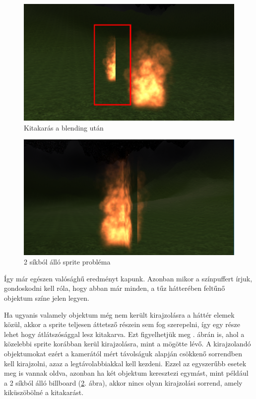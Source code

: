 \begin{figure}[h]
 \centering
 \includegraphics[width=\textwidth]{kepek/billboardOverlap.png}
 \caption{Kitakarás a blending után}
 \label{fig:spriteOverlap}
\end{figure}
\begin{figure}[h!]
 \centering
 \includegraphics[width=\textwidth]{kepek/doubleBillboard1.png}
 \caption{2 síkból álló sprite probléma}
 \label{fig:doubleSprite}
\end{figure}

Így már egészen valósághű eredményt kapunk. Azonban mikor a színpuffert írjuk, gondoskodni kell róla, hogy abban már minden, a tűz hátterében feltűnő objektum színe jelen legyen.

 Ha ugyanis valamely objektum még nem került kirajzolásra a háttér elemek közül, akkor a sprite teljesen áttetsző részein sem fog szerepelni, így egy része lehet hogy átlátszósággal lesz kitakarva. Ezt figyelhetjük meg . ábrán is, ahol a közelebbi sprite korábban kerül kirajzolásra, mint a mögötte lévő. A kirajzolandó objektumokat ezért a kamerától mért távolságuk alapján csökkenő sorrendben kell kirajzolni, azaz a legtávolabbiakkal kell kezdeni. Ezzel az egyszerűbb esetek meg is vannak oldva, azonban ha két objektum keresztezi egymást, mint például a 2 síkból álló billboard (\ref{fig:doubleSprite}. ábra), akkor nincs olyan kirajzolási sorrend, amely kiküszöbölné a kitakarást.

